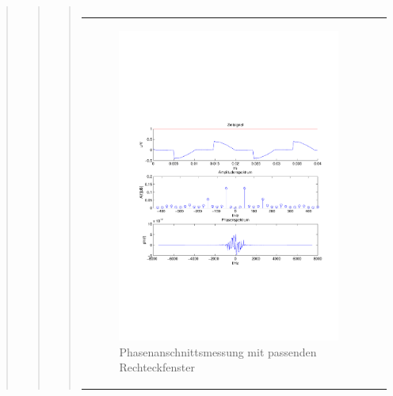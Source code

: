 \begin{quote}
\begin{quote}
\begin{quote}
\begin{center}
\begin{tabular}{ll}
                \end{tabular}
                \end{center}
                
                \begin{center}
                \begin{tabular}{ll}
    
                \hspace{-11em}
                    \begin{minipage}{0.6\textwidth}
    
                        \begin{figure}[H]
                            \label{fig:}
                            \includegraphics[scale=0.4, trim = 1.5cm 7cm 1.5cm 8cm,
                            clip]{./Bilder/Phasenanschnittsmessungmitrechteckfenster} %
                            \caption{Phasenanschnittsmessung mit passenden Rechteckfenster}
                        \end{figure}
    

\end{minipage}
\end{tabular}
\end{center}
\end{quote}
\end{quote}
\end{quote}

